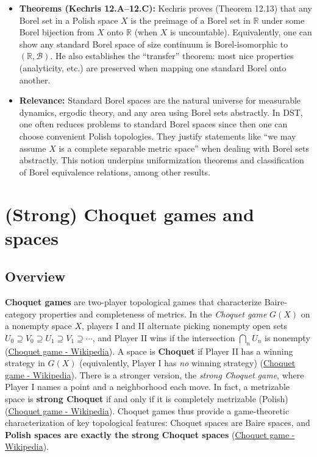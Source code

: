 \documentclass[11pt]{article}
\begin{document}
\begin{itemize}
\item \textbf{Theorems (Kechris 12.A--12.C):} Kechris proves (Theorem 12.13) that
any Borel set in a Polish space \(X\) is the preimage of a Borel set
in \(\mathbb{R}\) under some Borel bijection from \(X\) onto
\(\mathbb{R}\) (when \(X\) is uncountable). Equivalently, one can show
any standard Borel space of size continuum is Borel-isomorphic to
\((\mathbb{R},\mathcal{B})\). He also establishes the “transfer”
theorem: most nice properties (analyticity, etc.) are preserved when
mapping one standard Borel onto another.

\item \textbf{Relevance:} Standard Borel spaces are the natural universe for
measurable dynamics, ergodic theory, and any area using Borel sets
abstractly. In DST, one often reduces problems to standard Borel
spaces since then one can choose convenient Polish topologies. They
justify statements like “we may assume \(X\) is a complete separable
metric space” when dealing with Borel sets abstractly. This notion
underpins uniformization theorems and classification of Borel
equivalence relations, among other results.
\end{itemize}
\section{(Strong) Choquet games and spaces}
\label{strong-choquet-games-and-spaces}
\subsection{Overview}
\label{overview-2}
\textbf{Choquet games} are two-player topological games that characterize
Baire-category properties and completeness of metrics. In the \emph{Choquet
game} \(G(X)\) on a nonempty space \(X\), players I and II alternate
picking nonempty open sets
\(U_0\supseteq V_0\supseteq U_1\supseteq V_1\supseteq\cdots\), and
Player II wins if the intersection \(\bigcap_n U_n\) is nonempty
(\href{https://en.wikipedia.org/wiki/Choquet\_game\#:\~:text=,wins\%2C\%20otherwise\%20Player\%20II\%20wins}{Choquet
game - Wikipedia}). A space is \textbf{Choquet} if Player II has a winning
strategy in \(G(X)\) (equivalently, Player I has \emph{no} winning strategy)
(\href{https://en.wikipedia.org/wiki/Choquet\_game\#:\~:text=if\%20Player\%20I\%20has\%20no,that\%20are}{Choquet
game - Wikipedia}). There is a stronger version, the \emph{strong Choquet
game}, where Player I names a point and a neighborhood each move. In
fact, a metrizable space is \textbf{strong Choquet} if and only if it is
completely metrizable (Polish)
(\href{https://en.wikipedia.org/wiki/Choquet\_game\#:\~:text=All\%20nonempty\%20complete\%20metric\%20spaces,displaystyle}{Choquet
game - Wikipedia}). Choquet games thus provide a game-theoretic
characterization of key topological features: Choquet spaces are Baire
spaces, and \textbf{Polish spaces are exactly the strong Choquet spaces}
(\href{https://en.wikipedia.org/wiki/Choquet\_game\#:\~:text=All\%20nonempty\%20complete\%20metric\%20spaces,displaystyle}{Choquet
game - Wikipedia}).
\end{document}
